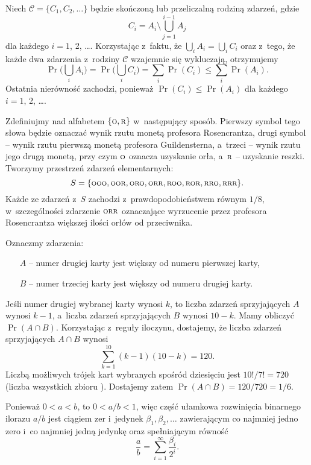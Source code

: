 
\exercise %
Niech $\mathcal{C}=\{C_1,C_2,\dots\}$ będzie skończoną lub przeliczalną rodziną zdarzeń, gdzie
\[
	C_i = A_i\setminus\bigcup_{j=1}^{i-1}A_j
\]
dla każdego $i=1$, 2, \dots.
Korzystając z~faktu, że $\bigcup_iA_i = \bigcup_iC_i$ oraz z~tego, że każde dwa zdarzenia z~rodziny $\mathcal{C}$ wzajemnie się wykluczają, otrzymujemy
\[
	\Pr\biggl(\bigcup_iA_i\biggr) = \Pr\biggl(\bigcup_iC_i\biggr) = \sum_i\Pr(C_i) \le \sum_i\Pr(A_i).
\]
Ostatnia nierówność zachodzi, ponieważ $\Pr(C_i)\le\Pr(A_i)$ dla każdego $i=1$, 2, \dots.

\exercise %
Zdefiniujmy  nad alfabetem $\{{\scriptstyle\rm O},{\scriptstyle\rm R}\}$ w~następujący sposób.
Pierwszy symbol tego słowa będzie oznaczać wynik rzutu monetą profesora Rosencrantza, drugi symbol -- wynik rzutu pierwszą monetą profesora Guildensterna, a~trzeci -- wynik rzutu jego drugą monetą, przy czym $\scriptstyle\rm O$ oznacza uzyskanie orła, a~$\scriptstyle\rm R$ -- uzyskanie reszki.
Tworzymy przestrzeń zdarzeń elementarnych:
\[
	S = \{{\scriptstyle\rm OOO},{\scriptstyle\rm OOR},{\scriptstyle\rm ORO},{\scriptstyle\rm ORR},{\scriptstyle\rm ROO},{\scriptstyle\rm ROR},{\scriptstyle\rm RRO},{\scriptstyle\rm RRR}\}.
\]
Każde ze zdarzeń z~$S$ zachodzi z~prawdopodobieństwem równym $1/8$, w~szczególności zdarzenie $\scriptstyle\rm ORR$ oznaczające wyrzucenie przez profesora Rosencrantza większej ilości orłów od przeciwnika.

\exercise %
Oznaczmy zdarzenia:
\begin{itemize}
	\item[$A$] -- numer drugiej karty jest większy od numeru pierwszej karty,
	\item[$B$] -- numer trzeciej karty jest większy od numeru drugiej karty.
\end{itemize}
Jeśli numer drugiej wybranej karty wynosi $k$, to liczba zdarzeń sprzyjających $A$ wynosi $k-1$, a~liczba zdarzeń sprzyjających $B$ wynosi $10-k$.
Mamy obliczyć $\Pr(A\cap B)$.
Korzystając z~reguły iloczynu, dostajemy, że liczba zdarzeń sprzyjających $A\cap B$ wynosi
\[
    \sum_{k=1}^{10}(k-1)(10-k) = 120.
\]
Liczbą możliwych trójek kart wybranych spośród dziesięciu jest $10!/7!=720$ (liczba wszystkich  zbioru ).
Dostajemy zatem $\Pr(A\cap B)=120/720=1/6$.

\exercise %
Ponieważ $0<a<b$, to $0<a/b<1$, więc część ułamkowa rozwinięcia binarnego ilorazu $a/b$ jest ciągiem zer i~jedynek $\beta_1,\beta_2,\dots$ zawierającym co najmniej jedno zero i~co najmniej jedną jedynkę oraz spełniającym równość
\[
    \frac{a}{b} = \sum_{i=1}^\infty\frac{\beta_i}{2^i}.
\]

